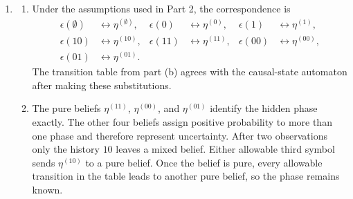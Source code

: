 \begin{solution}[ex:p3-2]
\begin{enumerate}
        The allowable updates are
        \[
          \begin{array}{c|cc}
            \text{current belief} & 0 & 1\\
            \hline
            \eta^{(\emptyset)} & \eta^{(0)} & \eta^{(1)}\\
            \eta^{(0)}         & \eta^{(00)} & \eta^{(01)}\\
            \eta^{(1)}         & \eta^{(10)} & \eta^{(11)}\\
            \eta^{(10)}        & \eta^{(00)} & \eta^{(01)}\\
            \eta^{(11)}        & \eta^{(00)} & \text{impossible}\\
            \eta^{(00)}        & \text{impossible} & \eta^{(01)}\\
            \eta^{(01)}        & \eta^{(11)} & \eta^{(11)}
          \end{array}
        \]
        This table specifies the requested symbol-labelled diagram and shows
        that every allowable update stays in $\mathcal B$.

      \item
        \begin{enumerate}
          \item Under the assumptions used in Part 2, the correspondence is
            \[
              \begin{aligned}
                \epsilon(\emptyset)&\longleftrightarrow\eta^{(\emptyset)},&
                \epsilon(0)&\longleftrightarrow\eta^{(0)},&
                \epsilon(1)&\longleftrightarrow\eta^{(1)},\\
                \epsilon(10)&\longleftrightarrow\eta^{(10)},&
                \epsilon(11)&\longleftrightarrow\eta^{(11)},&
                \epsilon(00)&\longleftrightarrow\eta^{(00)},\\
                \epsilon(01)&\longleftrightarrow\eta^{(01)}.
              \end{aligned}
            \]
            The transition table from part (b) agrees with the causal-state
            automaton after making these substitutions.

          \item The pure beliefs $\eta^{(11)}$, $\eta^{(00)}$, and
            $\eta^{(01)}$ identify the hidden phase exactly. The other four
            beliefs assign positive probability to more than one phase and
            therefore represent uncertainty.
            After two observations only the history $10$ leaves a mixed
            belief. Either allowable third symbol sends $\eta^{(10)}$ to a
            pure belief. Once the belief is pure, every allowable transition
            in the table leads to another pure belief, so the phase remains
            known.


\end{enumerate}
\end{enumerate}
\end{solution}
